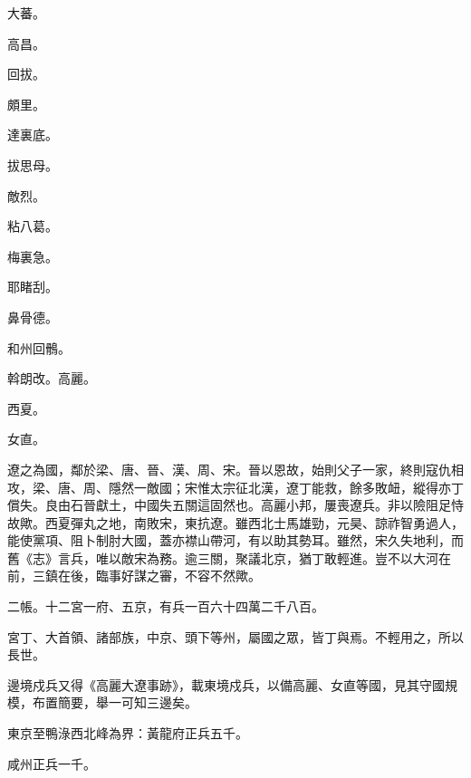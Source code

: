 \begin{pinyinscope}
 大蕃。



 高昌。



 回拔。



 頗里。



 達裏底。



 拔思母。



 敵烈。



 粘八葛。



 梅裏急。



 耶睹刮。



 鼻骨德。



 和州回鶻。



 斡朗改。高麗。



 西夏。



 女直。



 遼之為國，鄰於梁、唐、晉、漢、周、宋。晉以恩故，始則父子一家，終則寇仇相攻，梁、唐、周、隱然一敵國；宋惟太宗征北漢，遼丁能救，餘多敗衄，縱得亦丁償失。良由石晉獻土，中國失五關這固然也。高麗小邦，屢喪遼兵。非以險阻足恃故歟。西夏彈丸之地，南敗宋，東抗遼。雖西北士馬雄勁，元昊、諒祚智勇過人，能使黨項、阻卜制肘大國，蓋亦襟山帶河，有以助其勢耳。雖然，宋久失地利，而舊《志》言兵，唯以敵宋為務。逾三關，聚議北京，猶丁敢輕進。豈不以大河在前，三鎮在後，臨事好謀之審，不容不然歟。



 二帳。十二宮一府、五京，有兵一百六十四萬二千八百。



 宮丁、大首領、諸部族，中京、頭下等州，屬國之眾，皆丁與焉。不輕用之，所以長世。



 邊境戍兵又得《高麗大遼事跡》，載東境戍兵，以備高麗、女直等國，見其守國規模，布置簡要，舉一可知三邊矣。



 東京至鴨淥西北峰為界：黃龍府正兵五千。



 咸州正兵一千。




\end{pinyinscope}
